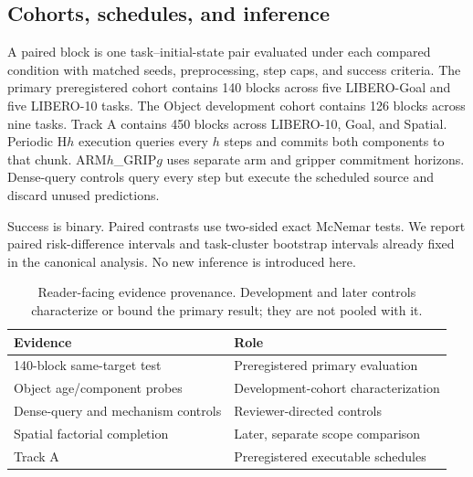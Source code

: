 \subsection{Cohorts, schedules, and inference}

A paired block is one task--initial-state pair evaluated under each compared
condition with matched seeds, preprocessing, step caps, and success criteria.
The primary preregistered cohort contains 140 blocks across five LIBERO-Goal
and five LIBERO-10 tasks. The Object development cohort contains 126 blocks
across nine tasks. Track A contains 450 blocks across LIBERO-10, Goal, and
Spatial. Periodic H$h$ execution queries every $h$ steps and commits both
components to that chunk. ARM$h$\_GRIP$g$ uses separate arm and gripper
commitment horizons. Dense-query controls query every step but execute the
scheduled source and discard unused predictions.

Success is binary. Paired contrasts use two-sided exact McNemar tests. We
report paired risk-difference intervals and task-cluster bootstrap intervals
already fixed in the canonical analysis. No new inference is introduced here.

\begin{table}[t]
\centering
\caption{Reader-facing evidence provenance. Development and later controls
characterize or bound the primary result; they are not pooled with it.}
\label{tab:provenance}
\small
\begin{tabular}{p{}p{}}
\toprule
Evidence & Role \\
\midrule
140-block same-target test & Preregistered primary evaluation \\
Object age/component probes & Development-cohort characterization \\
Dense-query and mechanism controls & Reviewer-directed controls \\
Spatial factorial completion & Later, separate scope comparison \\
Track A & Preregistered executable schedules \\
\bottomrule
\end{tabular}
\end{table}
